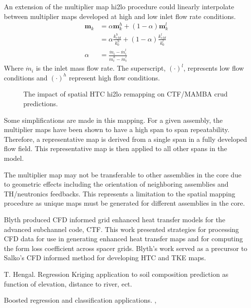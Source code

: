     An extension of the multiplier map hi2lo procedure could linearly interpolate between multiplier maps developed at high and low inlet flow rate conditions.
    \begin{align*}
        \mathbf m_k &= \alpha \mathbf m_k^h + (1 - \alpha) \mathbf m_k^l \\
                    &= \alpha \frac{k^h_{cfd}}{k^h_0} + (1 - \alpha) \frac{k^l_{cfd}}{k^l_0} \\
        \alpha & = \frac{\dot m_i - \dot m_i^l }{\dot m_i^h - \dot m_i^l}
    \end{align*}
    Where $\dot m_i$ is the inlet mass flow rate.  The superscript, $(\cdot)^l$, represents low flow conditions and $(\cdot)^h$ represent high flow conditions.


\begin{figure}[H]%
    \centering
    \qquad
    \caption[The impact of spatial HTC hi2lo remapping on CTF/MAMBA crud predictions.]{The impact of spatial HTC hi2lo remapping on CTF/MAMBA crud predictions.}%
    \label{fig:htc_remap_crud}%
\end{figure}


    Some simplifications are made in this mapping.  For a given assembly, the multiplier maps have been shown to have a high span to span repeatability.  Therefore, a representative map is derived from a single span in a fully developed flow field.  This representative map is then applied to all other spans in the model.

    The multiplier map may not be transferable to other assemblies in the core due to geometric effects including the orientation of neighboring assemblies and TH/neutronics feedbacks.  This represents a limitation to the spatial mapping procedure as unique maps must be generated for different assemblies in the core.
     
    Blyth produced CFD informed grid enhanced heat transfer models for the advanced subchannel code, CTF.  This work presented strategies for processing CFD data for use in generating enhanced heat transfer maps and for computing the form loss coefficient across spacer grids.  Blyth's work served as a precursor to Salko's CFD informed method for developing HTC and TKE maps.

    T. Hengal. Regression Kriging application to soil composition prediction as function of elevation, distance to river, ect. \cite{Hengl07}
    
    Boosted regression and classification applications. \cite{moisen2006}, \cite{friedman2002}



